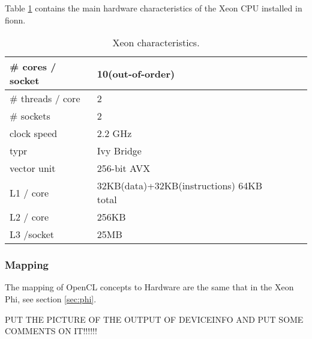 \par{Table \ref{tab:xeon_arch} contains the main hardware characteristics of the Xeon CPU installed in fionn.}

\begin{table}[!h]
    \centering
    \begin{tabular}{| l | l | l | l |}
    \hline
    \# cores / socket& 10(out-of-order) \\ \hline
    \# threads / core& 2 \\ \hline
    \# sockets & 2 \\ \hline
    clock speed & 2.2 GHz \\ \hline
    typr & Ivy Bridge \\ \hline
    vector unit & 256-bit AVX \\ \hline
    L1 / core & 32KB(data)+32KB(instructions) 64KB total \\ \hline
    L2 / core & 256KB \\ \hline
    L3 /socket & 25MB \\ \hline
    \end{tabular}
    \caption{Xeon characteristics\cite{xeon_specs}.}
    \label{tab:xeon_arch}
\end{table}

\subsubsection{Mapping}

\par{The mapping of OpenCL concepts to Hardware are the same that in the Xeon Phi, see section \ref{sec:phi}.}

\par{{\color{red} PUT THE PICTURE OF THE OUTPUT OF DEVICEINFO AND PUT SOME COMMENTS ON IT!!!!!!}}
